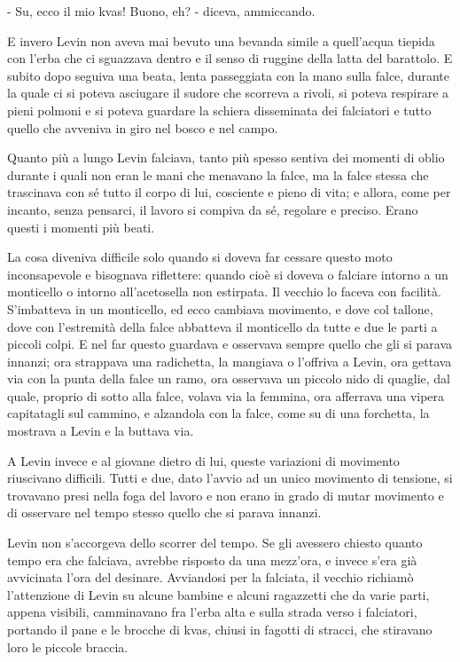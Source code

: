- Su, ecco il mio kvas! Buono, eh? - diceva, ammiccando. 

E invero Levin non aveva mai bevuto una bevanda simile a quell'acqua tiepida con l'erba che ci sguazzava dentro e il senso di ruggine della latta del barattolo. E subito dopo seguiva una beata, lenta passeggiata con la mano sulla falce, durante la quale ci si poteva asciugare il sudore che scorreva a rivoli, si poteva respirare a pieni polmoni e si poteva guardare la schiera disseminata dei falciatori e tutto quello che avveniva in giro nel bosco e nel campo. 

Quanto più a lungo Levin falciava, tanto più spesso sentiva dei momenti di oblio durante i quali non eran le mani che menavano la falce, ma la falce stessa che trascinava con sé tutto il corpo di lui, cosciente e pieno di vita; e allora, come per incanto, senza pensarci, il lavoro si compiva da sé, regolare e preciso. Erano questi i momenti più beati. 

La cosa diveniva difficile solo quando si doveva far cessare questo moto inconsapevole e bisognava riflettere: quando cioè si doveva o falciare intorno a un monticello o intorno all'acetosella non estirpata. Il vecchio lo faceva con facilità. S'imbatteva in un monticello, ed ecco cambiava movimento, e dove col tallone, dove con l'estremità della falce abbatteva il monticello da tutte e due le parti a piccoli colpi. E nel far questo guardava e osservava sempre quello che gli si parava innanzi; ora strappava una radichetta, la mangiava o l'offriva a Levin, ora gettava via con la punta della falce un ramo, ora osservava un piccolo nido di quaglie, dal quale, proprio di sotto alla falce, volava via la femmina, ora afferrava una vipera capitatagli sul cammino, e alzandola con la falce, come su di una forchetta, la mostrava a Levin e la buttava via. 

A Levin invece e al giovane dietro di lui, queste variazioni di movimento riuscivano difficili. Tutti e due, dato l'avvio ad un unico movimento di tensione, si trovavano presi nella foga del lavoro e non erano in grado di mutar movimento e di osservare nel tempo stesso quello che si parava innanzi. 

Levin non s'accorgeva dello scorrer del tempo. Se gli avessero chiesto quanto tempo era che falciava, avrebbe risposto da una mezz'ora, e invece s'era già avvicinata l'ora del desinare. Avviandosi per la falciata, il vecchio richiamò l'attenzione di Levin su alcune bambine e alcuni ragazzetti che da varie parti, appena visibili, camminavano fra l'erba alta e sulla strada verso i falciatori, portando il pane e le brocche di kvas, chiusi in fagotti di stracci, che stiravano loro le piccole braccia. 

